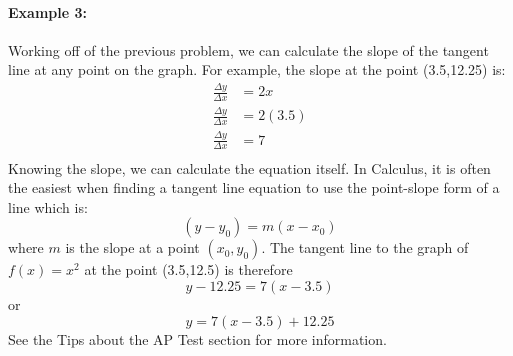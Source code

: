 \documentclass[../revisedmain.tex]{subfiles}
\begin{document}
	\paragraph{Example 3:} Working off of the previous problem, we can calculate the slope of the tangent line at any point on the graph. For example, the slope at the point (3.5,12.25) is:
	\begin{equation}
		\begin{split}
		\frac{\Delta y}{\Delta x}&=2x\\
		\frac{\Delta y}{\Delta x}&=2(3.5)\\
		\frac{\Delta y}{\Delta x}&=7\\
		\end{split}
	\end{equation}
	Knowing the slope, we can calculate the equation itself. In Calculus, it is often the easiest when finding a tangent line equation to use the point-slope form of a line which is: \[(y-y_0)=m(x-x_0)\] where \(m\) is the slope at a point \((x_0,y_0)\). The tangent line to the graph of \(f(x)=x^2\) at the point (3.5,12.5) is therefore \[y-12.25=7(x-3.5)\] or \[y=7(x-3.5)+12.25\] See the Tips about the AP Test section for more information.\\
\end{document}
